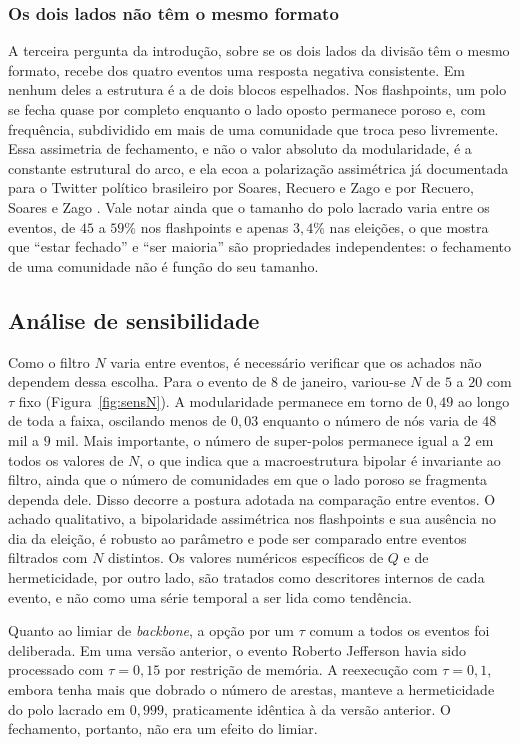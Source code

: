 \documentclass[conference]{IEEEtran}
\begin{document}
\subsubsection{Os dois lados não têm o mesmo formato}

A terceira pergunta da introdução, sobre se os dois lados da divisão têm o mesmo formato, recebe dos quatro eventos uma resposta negativa consistente. Em nenhum deles a estrutura é a de dois blocos espelhados. Nos flashpoints, um polo se fecha quase por completo enquanto o lado oposto permanece poroso e, com frequência, subdividido em mais de uma comunidade que troca peso livremente. Essa assimetria de fechamento, e não o valor absoluto da modularidade, é a constante estrutural do arco, e ela ecoa a polarização assimétrica já documentada para o Twitter político brasileiro por Soares, Recuero e Zago \cite{b_soares2019} e por Recuero, Soares e Zago \cite{b_recuero2021}. Vale notar ainda que o tamanho do polo lacrado varia entre os eventos, de $45$ a $59\%$ nos flashpoints e apenas $3{,}4\%$ nas eleições, o que mostra que ``estar fechado'' e ``ser maioria'' são propriedades independentes: o fechamento de uma comunidade não é função do seu tamanho.

\subsection{Análise de sensibilidade}
\label{sub:sensibilidade}

Como o filtro $N$ varia entre eventos, é necessário verificar que os achados não dependem dessa escolha. Para o evento de 8 de janeiro, variou-se $N$ de $5$ a $20$ com $\tau$ fixo (Figura~\ref{fig:sensN}). A modularidade permanece em torno de $0{,}49$ ao longo de toda a faixa, oscilando menos de $0{,}03$ enquanto o número de nós varia de $48$ mil a $9$ mil. Mais importante, o número de super-polos permanece igual a $2$ em todos os valores de $N$, o que indica que a macroestrutura bipolar é invariante ao filtro, ainda que o número de comunidades em que o lado poroso se fragmenta dependa dele. Disso decorre a postura adotada na comparação entre eventos. O achado qualitativo, a bipolaridade assimétrica nos flashpoints e sua ausência no dia da eleição, é robusto ao parâmetro e pode ser comparado entre eventos filtrados com $N$ distintos. Os valores numéricos específicos de $Q$ e de hermeticidade, por outro lado, são tratados como descritores internos de cada evento, e não como uma série temporal a ser lida como tendência.

Quanto ao limiar de \emph{backbone}, a opção por um $\tau$ comum a todos os eventos foi deliberada. Em uma versão anterior, o evento Roberto Jefferson havia sido processado com $\tau = 0{,}15$ por restrição de memória. A reexecução com $\tau = 0{,}1$, embora tenha mais que dobrado o número de arestas, manteve a hermeticidade do polo lacrado em $0{,}999$, praticamente idêntica à da versão anterior. O fechamento, portanto, não era um efeito do limiar.
\end{document}
